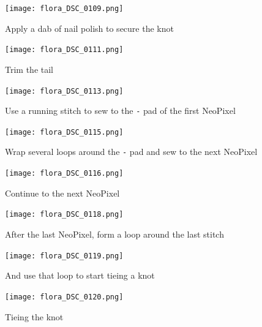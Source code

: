 \documentclass[letterpaper,twoside,12pt]{article}
\begin{document}
\begin{figure}[hbpt]\begin{centering}%
\texttt{[image: flora\_DSC\_0109.png]}
\caption{Apply a dab of nail polish to secure the knot}
\label{fig:flora_DSC_0109}
\end{centering}\end{figure}
\begin{figure}[hbpt]\begin{centering}%
\texttt{[image: flora\_DSC\_0111.png]}
\caption{Trim the tail}
\label{fig:flora_DSC_0111}
\end{centering}\end{figure}
\begin{figure}[hbpt]\begin{centering}%
\texttt{[image: flora\_DSC\_0113.png]}
\caption{Use a running stitch to sew to the \texttt{-} pad of the first NeoPixel}
\label{fig:flora_DSC_0113}
\end{centering}\end{figure}
\begin{figure}[hbpt]\begin{centering}%
\texttt{[image: flora\_DSC\_0115.png]} 
\caption{Wrap several loops around the \texttt{-} pad and sew to the next NeoPixel}
\label{fig:flora_DSC_0115}
\end{centering}\end{figure}
\begin{figure}[hbpt]\begin{centering}%
\texttt{[image: flora\_DSC\_0116.png]}
\caption{Continue to the next NeoPixel}
\label{fig:flora_DSC_0116}
\end{centering}\end{figure}
\begin{figure}[hbpt]\begin{centering}%
\texttt{[image: flora\_DSC\_0118.png]}
\caption{After the last NeoPixel, form a loop around the last stitch}
\label{fig:flora_DSC_0118}
\end{centering}\end{figure}
\begin{figure}[hbpt]\begin{centering}%
\texttt{[image: flora\_DSC\_0119.png]} 
\caption{And use that loop to start tieing a knot}
\label{fig:flora_DSC_0119}
\end{centering}\end{figure}
\begin{figure}[hbpt]\begin{centering}%
\texttt{[image: flora\_DSC\_0120.png]}
\caption{Tieing the knot}
\label{fig:flora_DSC_0120}
\end{centering}\end{figure}
\end{document}
